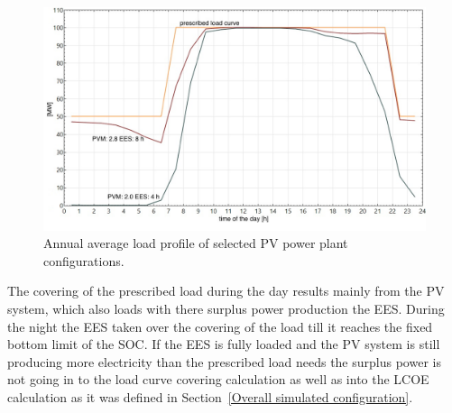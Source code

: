 \begin{figure}[htbp]  
\centering
\includegraphics[width=0.8\linewidth]{FIG/PV_annual_profil}
\caption[Annual average load profile of selected PV power plant configurations.]{Annual average load profile of selected PV power plant configurations.}\label{PV_annual_profil}
\end{figure}
The covering of the prescribed load during the day results mainly from the PV system, which also loads with there surplus power production the EES. During the night the EES taken over the covering of the load till it reaches the fixed bottom limit of the SOC. If the EES is fully loaded and the PV system is still producing more electricity than the prescribed load needs the surplus power is not going in to the load curve covering calculation as well as into the LCOE calculation as it was defined in Section~\ref{Overall simulated configuration}. 

